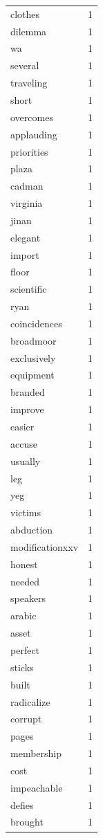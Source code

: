 \begin{tabular}{lr}
clothes & 1 \\
dilemma & 1 \\
wa & 1 \\
several & 1 \\
traveling & 1 \\
short & 1 \\
overcomes & 1 \\
applauding & 1 \\
priorities & 1 \\
plaza & 1 \\
cadman & 1 \\
virginia & 1 \\
jinan & 1 \\
elegant & 1 \\
import & 1 \\
floor & 1 \\
scientific & 1 \\
ryan & 1 \\
coincidences & 1 \\
broadmoor & 1 \\
exclusively & 1 \\
equipment & 1 \\
branded & 1 \\
improve & 1 \\
easier & 1 \\
accuse & 1 \\
usually & 1 \\
leg & 1 \\
yeg & 1 \\
victims & 1 \\
abduction & 1 \\
modificationxxv & 1 \\
honest & 1 \\
needed & 1 \\
speakers & 1 \\
arabic & 1 \\
asset & 1 \\
perfect & 1 \\
sticks & 1 \\
built & 1 \\
radicalize & 1 \\
corrupt & 1 \\
pages & 1 \\
membership & 1 \\
cost & 1 \\
impeachable & 1 \\
defies & 1 \\
brought & 1 \\

\end{tabular}
